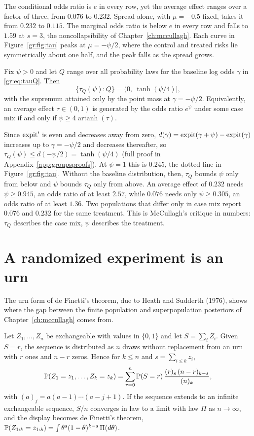 The conditional odds ratio is $e$ in every row, yet the average effect ranges over a factor of three, from $0.076$ to $0.232$. Spread alone, with $\mu=-0.5$ fixed, takes it from $0.232$ to $0.115$. The marginal odds ratio is below $e$ in every row and falls to $1.59$ at $s=3$, the noncollapsibility of Chapter~\ref{ch:mccullagh}. Each curve in Figure~\ref{gr:fig:tau} peaks at $\mu=-\psi/2$, where the control and treated risks lie symmetrically about one half, and the peak falls as the spread grows. 

\begin{proposition}\label{gr:prop:range}
Fix $\psi>0$ and let $Q$ range over all probability laws for the baseline log odds $\gamma$ in \eqref{gr:eq:tauQ}. Then
\[
\{\tau_Q(\psi):Q\}=\bigl(0,\ \tanh(\psi/4)\bigr],
\]
with the supremum attained only by the point mass at $\gamma=-\psi/2$. Equivalently, an average effect $\tau\in(0,1)$ is generated by the odds ratio $e^{\psi}$ under some case mix if and only if $\psi\ge4\operatorname{artanh}(\tau)$.
\end{proposition}

Since $\operatorname{expit}'$ is even and decreases away from zero, $d(\gamma)=\operatorname{expit}(\gamma+\psi)-\operatorname{expit}(\gamma)$ increases up to $\gamma=-\psi/2$ and decreases thereafter, so $\tau_Q(\psi)\le d(-\psi/2)=\tanh(\psi/4)$ (full proof in Appendix~\ref{app:groupsproofs}). At $\psi=1$ this is $0.245$, the dotted line in Figure~\ref{gr:fig:tau}. Without the baseline distribution, then, $\tau_Q$ bounds $\psi$ only from below and $\psi$ bounds $\tau_Q$ only from above. An average effect of $0.232$ needs $\psi\ge0.945$, an odds ratio of at least $2.57$, while $0.076$ needs only $\psi\ge0.305$, an odds ratio of at least $1.36$. Two populations that differ only in case mix report $0.076$ and $0.232$ for the same treatment. This is McCullagh's critique in numbers: $\tau_Q$ describes the case mix, $\psi$ describes the treatment.

\section{A randomized experiment is an urn}\label{gr:sec:urn}

The urn form of de Finetti's theorem, due to Heath and Sudderth (1976), shows where the gap between the finite population and superpopulation posteriors of Chapter~\ref{ch:mccullagh} comes from.

\begin{theorem}\label{gr:thm:hs}
Let $Z_1,\dots,Z_n$ be exchangeable with values in $\{0,1\}$ and let $S=\sum_iZ_i$. Given $S=r$, the sequence is distributed as $n$ draws without replacement from an urn with $r$ ones and $n-r$ zeros. Hence for $k\le n$ and $s=\sum_{i\le k}z_i$,
\[
\mathbb{P}(Z_1=z_1,\dots,Z_k=z_k)=\sum_{r=0}^n \mathbb{P}(S=r)\,\frac{(r)_{s}\,(n-r)_{k-s}}{(n)_k},
\]
with $(a)_j=a(a-1)\cdots(a-j+1)$. If the sequence extends to an infinite exchangeable sequence, $S/n$ converges in law to a limit with law $\Pi$ as $n\to\infty$, and the display becomes de Finetti's theorem, $\mathbb{P}(Z_{1:k}=z_{1:k})=\int\theta^{s}(1-\theta)^{k-s}\,\Pi(d\theta)$.
\end{theorem}

